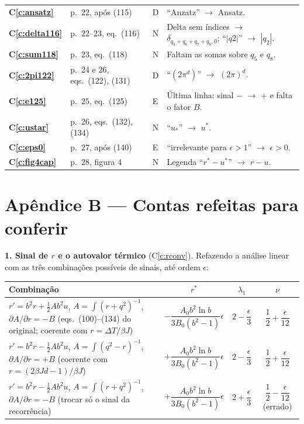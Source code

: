 \documentclass[12pt,a4paper]{article}
\newcounter{corr}
\newcommand{\Cref}[1]{\textbf{C\ref{#1}}}
\begin{document}
{\begin{longtable}{@{}p{0.9cm}p{2.9cm}p{0.6cm}p{10.6cm}@{}}
\Cref{c:ansatz} & p.~22, após (115) & D & ``Anzatz'' $\to$ Ansatz.\\
\Cref{c:delta116} & p.~22--23, eq.~(116) & N & Delta sem índices $\to$ $\delta_{q_5+q_6+q_7+q_8,0}$; ``$|q2|$'' $\to$ $|q_2|$.\\
\Cref{c:sum118} & p.~23, eq.~(118) & N & Faltam as somas sobre $q_5$ e $q_8$.\\
\Cref{c:2pi122} & p.~24 e 26, eqs.~(122), (131) & D & ``$(2\pi^d)$'' $\to$ $(2\pi)^d$.\\
\Cref{c:e125} & p.~25, eq.~(125) & E & Última linha: sinal $-$ $\to$ $+$ e falta o fator $B$.\\
\Cref{c:ustar} & p.~26, eqs.~(132), (134) & N & ``$u_*$'' $\to$ $u^*$.\\
\Cref{c:eps0} & p.~27, após (140) & E & ``irrelevante para $\epsilon>1$'' $\to$ $\epsilon>0$.\\
\Cref{c:fig4cap} & p.~28, figura 4 & N & Legenda ``$r^*-u^*$'' $\to$ $r-u$.\\
\end{longtable}
\normalsize

\section*{Apêndice B --- Contas refeitas para conferir}

\textbf{1. Sinal de $r$ e o autovalor térmico} (C\ref{c:rconv}). Refazendo a análise linear
com as três combinações possíveis de sinais, até ordem $\epsilon$:

\begin{center}
\small\begin{tabular}{@{}p{6.4cm}ccc@{}}
\toprule
Combinação & $r^*$ & $\lambda_1$ & $\nu$\\
\midrule
$r'=b^2r+\frac12Ab^2u$, $A=\int(r+q^2)^{-1}$, $\partial A/\partial r=-B$\newline
(eqs.~(100)--(134) do original; coerente com $r=\Delta T/\beta J$) &
$-\dfrac{A_0b^2\ln b}{3B_0(b^2-1)}\epsilon$ & $2-\dfrac\epsilon3$ & $\dfrac12+\dfrac\epsilon{12}$\\[10pt]
$r'=b^2r-\frac12Ab^2u$, $A=\int(q^2-r)^{-1}$, $\partial A/\partial r=+B$\newline
(coerente com $r=(2\beta Jd-1)/\beta J$) &
$+\dfrac{A_0b^2\ln b}{3B_0(b^2-1)}\epsilon$ & $2-\dfrac\epsilon3$ & $\dfrac12+\dfrac\epsilon{12}$\\[10pt]
$r'=b^2r-\frac12Ab^2u$, $A=\int(r+q^2)^{-1}$, $\partial A/\partial r=-B$\newline
(trocar só o sinal da recorrência) &
$+\dfrac{A_0b^2\ln b}{3B_0(b^2-1)}\epsilon$ & $2+\dfrac\epsilon3$ & $\dfrac12-\dfrac\epsilon{12}$ (errado)\\
\bottomrule
\end{tabular}
\end{center}

}
\end{document}
